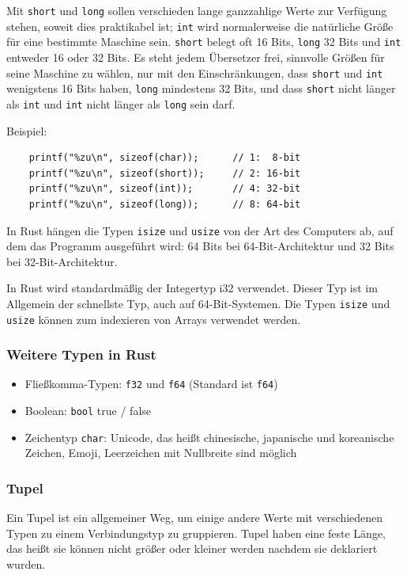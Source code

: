 Mit \verb"short" und \verb"long" sollen verschieden lange ganzzahlige Werte zur Verfügung stehen, soweit dies praktikabel ist; \verb"int" wird normalerweise die natürliche Größe für eine bestimmte Maschine sein. \verb"short" belegt oft 16 Bits, \verb"long" 32 Bits und \verb"int" entweder 16 oder 32 Bits. Es steht jedem Übersetzer frei, sinnvolle Größen für seine Maschine zu wählen, nur mit den Einschränkungen, dass \verb"short" und \verb"int" wenigstens 16 Bits haben, \verb"long" mindestens 32 Bits, und dass \verb"short" nicht länger als \verb"int" und \verb"int" nicht länger als \verb"long" sein darf. \cite{ProgInC}

Beispiel:

\begin{lstlisting}
    printf("%zu\n", sizeof(char));      // 1:  8-bit
    printf("%zu\n", sizeof(short));     // 2: 16-bit
    printf("%zu\n", sizeof(int));       // 4: 32-bit
    printf("%zu\n", sizeof(long));      // 8: 64-bit
\end{lstlisting}

In Rust hängen die Typen \verb"isize" und \verb"usize" von der Art des Computers ab, auf dem das Programm ausgeführt wird: 64 Bits bei 64-Bit-Architektur und 32 Bits bei 32-Bit-Architektur.

In Rust wird standardmäßig der Integertyp i32 verwendet. Dieser Typ ist im Allgemein der schnellste Typ, auch auf 64-Bit-Systemen. Die Typen \verb"isize" und \verb"usize" können zum indexieren von Arrays verwendet werden.

\subsubsection{Weitere Typen in Rust}

\begin{itemize}
    \item Fließkomma-Typen: \verb"f32" und \verb"f64" (Standard ist \verb"f64")
    \item Boolean: \verb"bool" true / false
    \item Zeichentyp \verb"char": Unicode, das heißt chinesische, japanische und koreanische Zeichen, Emoji, Leerzeichen mit Nullbreite sind möglich
\end{itemize}

\subsubsection{Tupel}

Ein Tupel ist ein allgemeiner Weg, um einige andere Werte mit verschiedenen Typen zu einem Verbindungstyp zu gruppieren. Tupel haben eine feste Länge, das heißt sie können nicht größer oder kleiner werden nachdem sie deklariert wurden.

